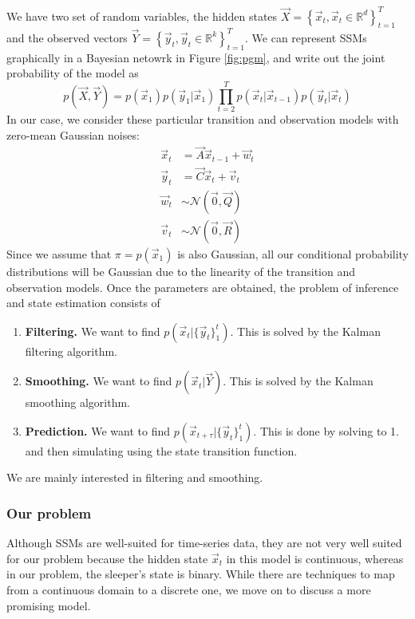	We have two set of random variables, the hidden states $\vec X = \left\{ \vec{x}_t,\vec{x}_t \in \mathbb{R}^d \right\}_{t = 1}^{T}$ and the observed vectors $\vec Y = \left\{ \vec{y}_t, \vec{y}_t \in \mathbb{R}^k \right\}_{t = 1}^{T}$. We can represent SSMs graphically in a Bayesian netowrk in Figure \ref{fig:pgm}, and write out the joint probability of the model as
	\begin{equation}
		p\left( \vec X, \vec Y \right) = p(\vec x_1) p(\vec y_1 | \vec x_1) \prod_{t = 2}^{T} {p(\vec x_t | \vec x_{t - 1}) p(\vec y_t | \vec x_t)}
	\end{equation}
	In our case, we consider these particular transition and observation models with zero-mean Gaussian noises:
	\begin{align}
		\vec x_t & = \vec A \vec x_{t - 1} + \vec w_t\\
		\vec y_t & = \vec C \vec x_t + \vec v_t \\
		\vec w_t & \sim \mathcal{N} (\vec 0, \vec Q) \\
		\vec v_t & \sim \mathcal{N} (\vec 0, \vec R)
	\end{align}
	Since we assume that $\pi = p(\vec x_1)$ is also Gaussian, all our conditional probability distributions will be Gaussian due to the linearity of the transition and observation models. Once the parameters are obtained, the problem of inference and state estimation consists of	
	\begin{enumerate}
		\item \textbf{Filtering.} We want to find $p(\vec x_t | \{\vec y_t\}_1^t)$. This is solved by the Kalman filtering algorithm.
		\item \textbf{Smoothing.} We want to find $p(\vec x_t | \vec Y)$. This is solved by the Kalman smoothing algorithm.
		\item \textbf{Prediction.} We want to find $p(\vec x_{t + \tau} | \{\vec y_t\}_1^t)$. This is done by solving to 1. and then simulating using the state transition function.
	\end{enumerate}
	We are mainly interested in filtering and smoothing.

\subsubsection{Our problem}
	Although SSMs are well-suited for time-series data, they are not very well suited for our problem because the hidden state $\vec x_t$ in this model is continuous, whereas in our problem, the sleeper's state is binary. While there are techniques to map from a continuous domain to a discrete one, we move on to discuss a more promising model.
